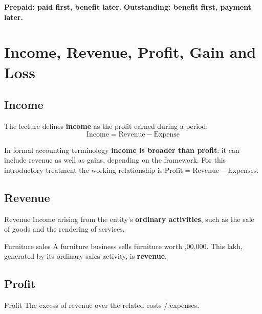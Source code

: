 \documentclass[11pt,a4paper]{article}
\newcommand{\Rs}{\ifmmode\text{\rsfont ₹}\else{\rsfont ₹}\fi}
\begin{document}
\begin{keybox}
\textbf{Prepaid: paid first, benefit later.} \quad \textbf{Outstanding: benefit first, payment later.}
\end{keybox}

\section{Income, Revenue, Profit, Gain and Loss}

\subsection{Income}

The lecture defines \textbf{income} as the profit earned during a period:
\[
\boxed{\text{Income}=\text{Revenue}-\text{Expense}}
\]

\begin{impbox}
In formal accounting terminology \textbf{income is broader than profit}: it can include revenue as well as gains,
depending on the framework. For this introductory treatment the working relationship is
$\text{Profit}=\text{Revenue}-\text{Expenses}$.
\end{impbox}

\subsection{Revenue}

\begin{defbox}{Revenue}
Income arising from the entity's \textbf{ordinary activities}, such as the sale of goods and the rendering
of services.
\end{defbox}

\begin{exbox}{Furniture sales}
A furniture business sells furniture worth \Rs 5,00,000. This \Rs 5 lakh, generated by its ordinary sales activity,
is \textbf{revenue}.
\end{exbox}

\subsection{Profit}

\begin{defbox}{Profit}
The excess of revenue over the related costs / expenses.
\end{defbox}
\end{document}
